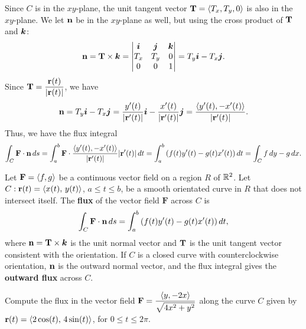 \documentclass[mathNotesPreamble]{subfiles}
\begin{document}
  Since $C$ is in the $xy$-plane, the unit tangent vector ${\mathbf{T}}={\left\langle T_x,T_y,0 \right\rangle}$ is also in the $xy$-plane. We let ${\mathbf{n}}$ be in the $xy$-plane as well, but using the cross product of ${\mathbf{T}}$ and ${\bm{k}}$:
  \begin{align*}
    {\mathbf{n}}={\mathbf{T}}\times{\bm{k}}=
    \begin{vmatrix}
      {\bm{i}}& {\bm{j}}& {\bm{k}}\\
      T_x& T_y& 0\\
      0& 0& 1
    \end{vmatrix}
    = T_y{\bm{i}}-T_x{\bm{j}}.
  \end{align*}
  Since ${\mathbf{T}}=\dfrac{{\mathbf{r}}(t)}{{\left\vert{\mathbf{r}}(t)\right\vert}}$, we have 
    \[{\mathbf{n}}=T_y{\bm{i}}-T_x{\bm{j}}=\frac{y'(t)}{{\left\vert{\mathbf{r}}'(t)\right\vert}}{\bm{i}}-\frac{x'(t)}{{\left\vert{\mathbf{r}}'(t)\right\vert}}{\bm{j}}=\frac{{\left\langle y'(t),-x'(t) \right\rangle}}{{\left\vert{\mathbf{r}}'(t)\right\vert}}.\]
  Thus, we have the flux integral
    \[\int_C \mathbf F\cdot{\mathbf{n}}\,ds =\int_a^b \mathbf F\cdot \frac{{\left\langle y'(t),-x'(t) \right\rangle}}{{\left\vert{\mathbf{r}}'(t)\right\vert}} {\left\vert{\mathbf{r}}'(t)\right\vert}\,dt=\int_a^b {\left(f(t)y'(t)-g(t)x'(t)\right)}\,dt=\int_C f\,dy-g\,dx.\]
  \pagebreak

  \begin{defn*}[Flux]
    Let $\mathbf F={\left\langle f,g \right\rangle}$ be a continuous vector field on a region $R$ of $\mathbb{R}^2$. Let $C: {\mathbf{r}}(t)={\left\langle x(t),\,y(t) \right\rangle}$, $a\leq t\leq b$, be a smooth orientated curve in $R$ that does not intersect itself. The \textbf{flux} of the vector field $\mathbf F$ across $C$ is
      \[\int_C \mathbf F\cdot {\mathbf{n}}\,ds=\int_a^b {\left(f(t)y'(t)-g(t)x'(t)\right)}\,dt,\]
    where ${\mathbf{n}}={\mathbf{T}}\times{\bm{k}}$ is the unit normal vector and ${\mathbf{T}}$ is the unit tangent vector consistent with the orientation. If $C$ is a closed curve with counterclockwise orientation, ${\mathbf{n}}$ is the outward normal vector, and the flux integral gives the \textbf{outward flux} across $C$.
  \end{defn*}

  \begin{ex*}
    Compute the flux in the vector field $\mathbf F=\dfrac{{\left\langle y,-2x \right\rangle}}{\sqrt{4x^2+y^2}}$ along the curve $C$ given by ${\mathbf{r}}(t)={\left\langle 2\cos(t),\,4\sin(t) \right\rangle}$, for $0\leq t\leq 2\pi$.
  \end{ex*}
  \pagebreak
  
\end{document}
